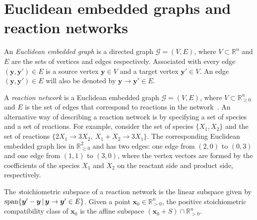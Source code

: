\documentclass[11pt]{article}
\theoremstyle{plain}
\theoremstyle{definition}
\theoremstyle{remark}
\newcommand\x{\boldsymbol{x}}
\newcommand\by{\boldsymbol{y}}
\newcommand\GG{\mathcal{G}}
\begin{document}
\section{Euclidean embedded graphs and reaction networks}\label{sec:reaction_networks}

An \emph{Euclidean embedded graph} is a directed graph $\GG = (V,E)$, where $V\subset\mathbb{R}^n$ and $E$ are the sets of vertices and edges respectively. Associated with every edge $(\by,\by')\in E$ is a source vertex $\by\in V$ and a target vertex $\by'\in V$. An edge $(\by,\by')\in E$ will also be denoted by $\by\rightarrow\by'\in E$.

A \emph{reaction network} is a Euclidean embedded graph $\GG = (V,E)$, where $V\subset \mathbb{R}^n_{\ge 0}$ and $E$ is the set of edges that correspond to reactions in the network~\cite{craciun2015toric,craciun2019polynomial}. An alternative way of describing a reaction network is by specifying a set of species and a  set of reactions. For example, consider the set of species  $\{X_1,X_2\}$ and the set of  reactions $\{2X_1\rightarrow 3X_2, \  X_1+X_2\rightarrow 3X_1\}$. The corresponding  Euclidean embedded graph lies in $\mathbb{R}^2_{\ge 0}$ and has two edges: one edge from $(2,0)$ to $(0,3)$ and one edge from $(1,1)$ to $(3,0)$, where the vertex  vectors are formed by the coefficients of the species $X_1$ and $X_2$ on the reactant side and product side, respectively.

The {\emph stoichiometric subspace} of a reaction network is the linear subspace given by ${\rm span}\{\by'-\by\, |\, \by\rightarrow \by' \in E\}$. Given a point $\x_0\in\mathbb{R}^n_{>0}$, the positive stoichiometric compatibility class of $\x_0$ is the affine subspace $(\x_0 + S)\cap\mathbb{R}^n_{>0}$. 
\end{document}
